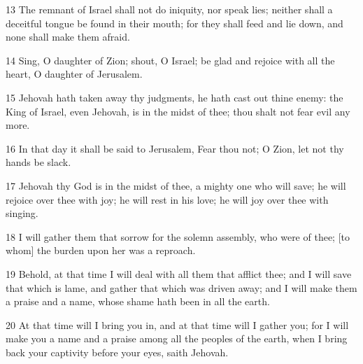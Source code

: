 \par 13 The remnant of Israel shall not do iniquity, nor speak lies; neither shall a deceitful tongue be found in their mouth; for they shall feed and lie down, and none shall make them afraid.
\par 14 Sing, O daughter of Zion; shout, O Israel; be glad and rejoice with all the heart, O daughter of Jerusalem.
\par 15 Jehovah hath taken away thy judgments, he hath cast out thine enemy: the King of Israel, even Jehovah, is in the midst of thee; thou shalt not fear evil any more.
\par 16 In that day it shall be said to Jerusalem, Fear thou not; O Zion, let not thy hands be slack.
\par 17 Jehovah thy God is in the midst of thee, a mighty one who will save; he will rejoice over thee with joy; he will rest in his love; he will joy over thee with singing.
\par 18 I will gather them that sorrow for the solemn assembly, who were of thee; [to whom] the burden upon her was a reproach.
\par 19 Behold, at that time I will deal with all them that afflict thee; and I will save that which is lame, and gather that which was driven away; and I will make them a praise and a name, whose shame hath been in all the earth.
\par 20 At that time will I bring you in, and at that time will I gather you; for I will make you a name and a praise among all the peoples of the earth, when I bring back your captivity before your eyes, saith Jehovah.

